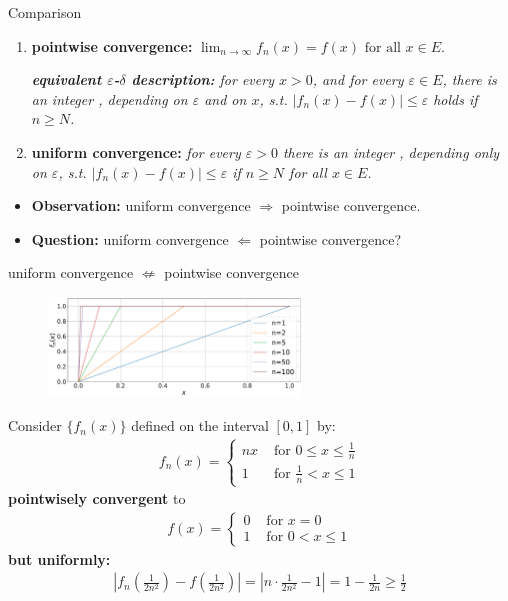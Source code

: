 \documentclass[10pt,xcolor=table,dvipsnames]{beamer}
\newcommand{\tb}[1]{\textbf{#1}}
\begin{document}
\begin{frame}{Comparison}
\begin{enumerate}
    \item \tb{pointwise convergence:} 
{
$\lim _{n \rightarrow \infty} f_n(x)=f(x) \text{ for all } x \in E$.}

\emph{\small \tb{equivalent $\varepsilon$-$\delta$ description:} for every $x>0$, and for every $\varepsilon \in E$, there is an integer , depending on $\varepsilon$ and on $x$, s.t. $\left|f_n(x)-f(x)\right| \leq \varepsilon$ holds if $n \geq N$.}
\pause
\item\tb{uniform convergence:} \emph{\small for every $\varepsilon>0$ there is an integer , depending only on $\varepsilon$, s.t.
$\left|f_n(x)-f(x)\right| \leq \varepsilon$ if $n\geq N$
for all $x \in E$.}
\end{enumerate}
\pause
\vspace{1cm}
\begin{itemize}
    \item \tb{Observation:} uniform convergence $\Rightarrow$ pointwise convergence.
   \pause \item \tb{Question:}  uniform convergence $\Leftarrow$ pointwise convergence?
\end{itemize}
\end{frame}

\begin{frame}{uniform convergence $\not\Leftarrow$ pointwise convergence}
\vspace{-0.3cm}
\begin{figure}[!htb]
\centering
\includegraphics[width=0.6\textwidth]{Figures/exm1.pdf}
\end{figure}
\vspace{-0.3cm}
Consider $\{f_n(x)\}$ defined on the interval $[0, 1]$ by:
\begin{align*}
f_n(x)= \begin{cases}n x & \text { for } 0 \leq x \leq \frac{1}{n} \\ 1 & \text { for } \frac{1}{n}<x \leq 1\end{cases}
\end{align*}
\tb{pointwisely convergent} to 
\begin{align*}
f(x)= \begin{cases}0 & \text { for } x=0 \\ 1 & \text { for } 0<x \leq 1\end{cases}
\end{align*}
\tb{but  uniformly:}
\begin{align*}
\left|f_n\left(\frac{1}{2n^2}\right)-f\left(\frac{1}{2n^2}\right)\right|=\left|n \cdot \frac{1}{2n^2}-1\right|=1-\frac{1}{2n}\ge \frac{1}{2}
\end{align*}
\end{frame}
\end{document}
